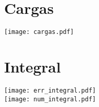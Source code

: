 \documentclass[paper=a4, fontsize=11pt]{scrartcl} %
\begin{document}


\section{Cargas}
\texttt{[image: cargas.pdf]}

\section{Integral}
\texttt{[image: err\_integral.pdf]}\\
\texttt{[image: num\_integral.pdf]}
\end{document}

